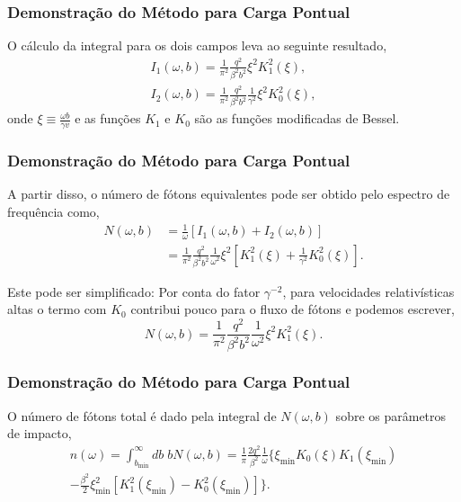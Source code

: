 \documentclass[xcolor=dvipsnames]{beamer}
\begin{document}
\begin{frame}
	\frametitle{Demonstração do Método para Carga Pontual}
	O cálculo da integral para os dois campos leva ao seguinte resultado,
	\begin{gather}
		I_1 (\omega , b) = \frac{1}{\pi ^2} \frac{q^2}{ \beta ^2 b^2}  
		\xi ^2 K_1 ^2 \left( \xi \right), \\
		I_2 (\omega , b) = \frac{1}{\pi ^2} \frac{q^2}{\beta ^2 b^2 }
		\frac{1}{\gamma ^2} \xi^2 K_0 ^2 \left( \xi \right),
	\end{gather}
	onde $\displaystyle \xi \equiv \frac {\omega b}{\gamma v}$ e as
	funções $K_1$ e $K_0$ são as funções modificadas de Bessel.
\end{frame}

\begin{frame}
	\frametitle{Demonstração do Método para Carga Pontual}
	A partir disso, o número de fótons equivalentes pode ser obtido pelo
	espectro de frequência como,
	\begin{equation}
		\begin{split}
		N(\omega , b) &= \frac{1}{\omega} \left[ I_1 (\omega , b) + I_2(\omega
			, b) \right]\\
			&= \frac{1}{\pi ^2} \frac{q^2} {\beta ^2 b^2}
			\frac{1}{\omega ^2} \xi ^2 \left[K_1^2 (\xi ) + \frac{1}{\gamma ^2}
			K_0 ^2 (\xi ) \right]. \label{eq_EP-SPEC}
		\end{split}
	\end{equation}
	\begin{block}{Este pode ser simplificado:}
		Por conta do fator $\gamma ^{-2}$, para velocidades relativísticas
		altas o termo com $K_0$ contribui pouco para o fluxo de fótons e
		podemos escrever,
		\begin{equation}
			N(\omega , b) = \frac{1}{\pi ^2} \frac{q^2} {\beta ^2 b^2}
			\frac{1}{\omega ^2} \xi ^2 K_1 ^2 (\xi).
		\end{equation}
	\end{block}
\end{frame}

\begin{frame}
	\frametitle{Demonstração do Método para Carga Pontual}
	O número de fótons total é dado pela integral de $N(\omega , b)$ sobre os
	parâmetros de impacto,
	\begin{multline}
		n(\omega) = \int _{b_{\text{min}}}^\infty db\; bN(\omega , b)  
		= \frac{1}{\pi} \frac{2q^2}{\beta ^2} \frac{1}{\omega} \biggl\{ \xi
		_\text{min} K_0 \left( \xi \right) K_1 \left( \xi _\text{min} \right) 
		\\
		-\frac{\beta ^2}{2} \xi _\text{min} ^2 \left[ K_1 ^2 \left( \xi
		_\text{min} \right) - K_0 ^2 \left( \xi _\text{min} \right) \right]
		\biggr\}. \label{eq_EPT}
	\end{multline}
\end{frame}
\end{document}
